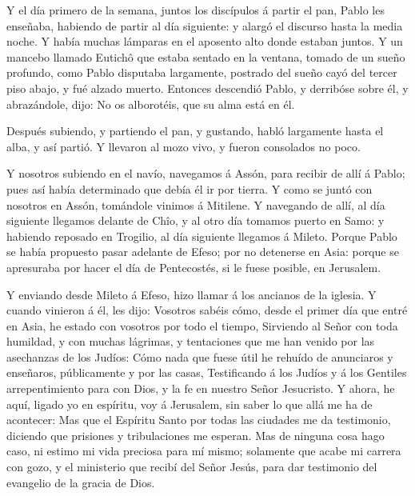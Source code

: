  Y el día primero de la semana, juntos los discípulos á
partir el pan, Pablo les enseñaba, habiendo de partir al día siguiente:
y alargó el discurso hasta la media noche.  Y había muchas
lámparas en el aposento alto donde estaban juntos.  Y un
mancebo llamado Eutichô que estaba sentado en la ventana, tomado de un
sueño profundo, como Pablo disputaba largamente, postrado del sueño cayó
del tercer piso abajo, y fué alzado muerto.  Entonces
descendió Pablo, y derribóse sobre él, y abrazándole, dijo: No os
alborotéis, que su alma está en él.

 Después subiendo, y partiendo el pan, y gustando, habló
largamente hasta el alba, y así partió.  Y llevaron al mozo
vivo, y fueron consolados no poco.

 Y nosotros subiendo en el navío, navegamos á Assón, para
recibir de allí á Pablo; pues así había determinado que debía él ir por
tierra.  Y como se juntó con nosotros en Assón, tomándole
vinimos á Mitilene.  Y navegando de allí, al día siguiente
llegamos delante de Chîo, y al otro día tomamos puerto en Samo: y
habiendo reposado en Trogilio, al día siguiente llegamos á Mileto.
 Porque Pablo se había propuesto pasar adelante de Efeso;
por no detenerse en Asia: porque se apresuraba por hacer el día de
Pentecostés, si le fuese posible, en Jerusalem.

 Y enviando desde Mileto á Efeso, hizo llamar á los
ancianos de la iglesia.  Y cuando vinieron á él, les dijo:
Vosotros sabéis cómo, desde el primer día que entré en Asia, he estado
con vosotros por todo el tiempo,  Sirviendo al Señor con
toda humildad, y con muchas lágrimas, y tentaciones que me han venido
por las asechanzas de los Judíos:  Cómo nada que fuese útil
he rehuído de anunciaros y enseñaros, públicamente y por las casas,
 Testificando á los Judíos y á los Gentiles arrepentimiento
para con Dios, y la fe en nuestro Señor Jesucristo.  Y
ahora, he aquí, ligado yo en espíritu, voy á Jerusalem, sin saber lo que
allá me ha de acontecer:  Mas que el Espíritu Santo por
todas las ciudades me da testimonio, diciendo que prisiones y
tribulaciones me esperan.  Mas de ninguna cosa hago caso,
ni estimo mi vida preciosa para mí mismo; solamente que acabe mi carrera
con gozo, y el ministerio que recibí del Señor Jesús, para dar
testimonio del evangelio de la gracia de Dios.

